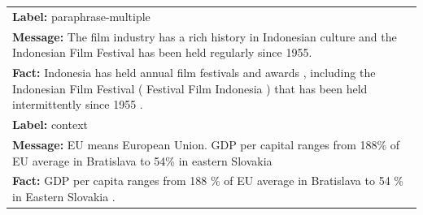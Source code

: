 \begin{table}
\begin{tabular}{p{15cm}}
        \midrule
        \textbf{Label:} paraphrase-multiple                                                                                                                                                                                                                                                                                                                                                                          \\
        \textbf{Message:} The film industry has a rich history in Indonesian culture and the Indonesian Film Festival has been held regularly since 1955.                                                                                                                                                                                                                                                            \\
        \textbf{Fact:} Indonesia has held annual film festivals and awards , including the Indonesian Film Festival ( Festival Film Indonesia ) that has been held intermittently since 1955 .                                                                                                                                                                                                                       \\
        \midrule
        \textbf{Label:} context                                                                                                                                                                                                                                                                                                                                                                                      \\
        \textbf{Message:} EU means European Union. GDP per capital ranges from 188\% of EU average in Bratislava to 54\% in eastern Slovakia                                                                                                                                                                                                                                                                         \\
        \textbf{Fact:} GDP per capita ranges from 188 \% of EU average in Bratislava to 54 \% in Eastern Slovakia .                                                                                                                                                                                                                                                                                                  \\

\end{tabular}
\end{table}
